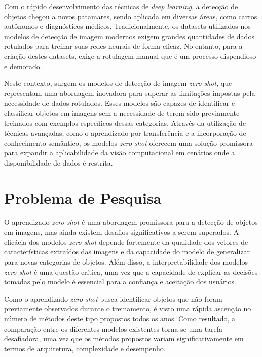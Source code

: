 \documentclass[openany, a4paper,12pt, oneside]{article}
\begin{document}
Com o r\'{a}pido desenvolvimento das t\'{e}cnicas de \textit{deep learning}, a detec\c{c}\~{a}o de objetos chegou a novos patamares\cite{nature14539}, sendo aplicada em diversas \'{a}reas, como carros aut\^{o}nomos \cite{cordts2016} e diagn\'{o}sticos m\'{e}dicos\cite{dong2017}. Tradicionalmente, os datasets utilizados nos modelos de detecção de imagem modernos exigem grandes quantidades de dados rotulados para treinar suas redes neurais de forma eficaz. No entanto, para a cria\c{c}\~{a}o destes datasets, exige a rotulagem manual que é um processo dispendioso e demorado\cite{shankar2017}\cite{cordts2016}.

Neste contexto, surgem os modelos de detecção de imagem \textit{zero-shot}, que representam uma abordagem inovadora para superar as limitações impostas pela necessidade de dados rotulados. Esses modelos são capazes de identificar e classificar objetos em imagens sem a necessidade de terem sido previamente treinados com exemplos específicos dessas categorias\cite{Bansal_2018_ECCV}. Através da utilização de técnicas avançadas, como o aprendizado por transferência\cite{Qi2011}\cite{fu2017} e a incorporação de conhecimento semântico\cite{joulin2016}\cite{mikolov2013}, os modelos \textit{zero-shot} oferecem uma solução promissora para expandir a aplicabilidade da visão computacional em cenários onde a disponibilidade de dados é restrita.

\section{Problema de Pesquisa}

O aprendizado \textit{zero-shot} é uma abordagem promissora para a detecção de objetos em imagens, mas ainda existem desafios significativos a serem superados. A eficácia dos modelos \textit{zero-shot} depende fortemente da qualidade dos vetores de características extraídos das imagens e da capacidade do modelo de generalizar para novas categorias de objetos. Além disso, a interpretabilidade dos modelos \textit{zero-shot} é uma questão crítica, uma vez que a capacidade de explicar as decisões tomadas pelo modelo é essencial para a confiança e aceitação dos usuários\cite{Bansal_2018_ECCV}.

Como o aprendizado \textit{zero-shot} busca identificar objetos que n\~{a}o foram previamente observados durante o treinamento\cite{lampert2014}\cite{Rohrbach2011}, \'{e} visto uma r\'{a}pida ascen\c{c}\~{a}o no n\'{u}mero de m\'{e}todos deste tipo propostos todos os anos. Como resultado, a compara\c{c}\~{a}o entre os diferentes modelos existentes torna-se uma tarefa desafiadora, uma vez que os métodos propostos variam significativamente em termos de arquitetura, complexidade e desempenho\cite{xian2020}.
\end{document}
